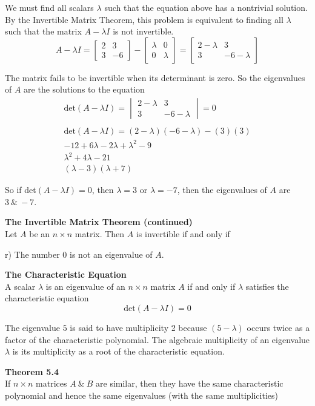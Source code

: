 \documentclass{article}
\begin{document}
  We must find all scalars $ \lambda $ such that the equation above has a nontrivial solution. By the Invertible Matrix Theorem, this problem is equivalent to finding all $ \lambda $ such that the matrix $ A - \lambda I $ is not invertible.
  \[
    A - \lambda I = \begin{bmatrix}
      2 &3\\
      3 &-6
    \end{bmatrix} -
    \begin{bmatrix}
      \lambda &0\\
      0 &\lambda
    \end{bmatrix} =
    \begin{bmatrix}
      2 -\lambda &3\\
      3 &-6-\lambda
    \end{bmatrix}
  \]

  The matrix fails to be invertible when its determinant is zero. So the eigenvalues of $ A $ are the solutions to the equation
  \[
    \begin{gathered}
    \text{det}(A-\lambda I) = \begin{vmatrix}
    2-\lambda &3\\
    3 &-6-\lambda
    \end{vmatrix}=0\\
    ~\\
    \text{det}(A-\lambda I)=(2-\lambda)(-6-\lambda)-(3)(3)\\
    -12+6\lambda-2\lambda+\lambda^{2}-9\\
    \lambda^{2}+4\lambda-21\\
    (\lambda-3)(\lambda+7)
    \end{gathered}
  \]

  So if det$ (A-\lambda I)=0 $, then $ \lambda=3 $ or $ \lambda=-7$, then the eigenvalues of $ A $ are $ 3 ~\&~ -7 $.
  
  \textbf{The Invertible Matrix Theorem (continued)}\\
  Let $ A $ be an $ n \times n $ matrix. Then $ A $ is invertible if and only if

  r) The number $ 0 $ is not an eigenvalue of $ A $.
  
  \textbf{The Characteristic Equation}\\
  A scalar $ \lambda $ is an eigenvalue of an $ n \times n $ matrix $ A $ if and only if $ \lambda $ satisfies the characteristic equation
  \[
    \text{det}(A- \lambda I)=0
  \]

  The eigenvalue $ 5 $ is said to have multiplicity 2 because $ (5-\lambda) $ occurs twice as a factor of the characteristic polynomial. The algebraic multiplicity of an eigenvalue $ \lambda $ is its multiplicity as a root of the characteristic equation.

  \textbf{Theorem 5.4}\\
  If $ n \times n $ matrices $ A ~\&~ B $ are similar, then they have the same characteristic polynomial and hence the same eigenvalues (with the same multiplicities)
\end{document}
